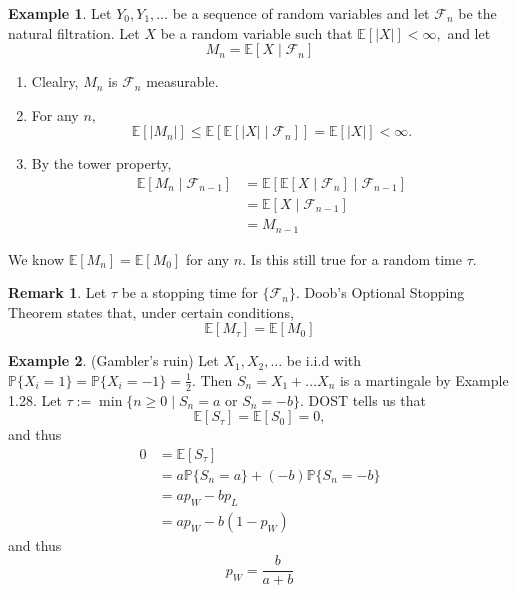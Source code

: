 \documentclass[10pt, oneside]{article}
\newcommand{\bbP}{\mathbb{P}}
\newcommand{\bbE}{\mathbb{E}}
\theoremstyle{definition}
\newtheorem{exmp}{Example}[section]
\newtheorem{rem}{Remark}
\begin{document}
\begin{exmp}
    Let $Y_0, Y_1, \dots$ be a sequence of random variables and let $\mathcal{F}_n$ be the natural filtration. Let $X$ be a random variable such that $\bbE[|X|] < \infty,$ and let 
    \[M_n = \bbE[X \mid \mathcal{F}_n]\]
    \begin{enumerate}
        \item Clealry, $M_n$ is $\mathcal{F}_n$ measurable.
        \item For any $n,$
    \[\bbE[|M_n|] \leq \bbE[\bbE[|X| \mid \mathcal{F}_n]] = \bbE[|X|] < \infty.\]
    \item By the tower property,
\begin{align*}
    \bbE[M_n \mid \mathcal{F}_{n-1}] &= \bbE[\bbE[X \mid \mathcal{F}_{n}] \mid \mathcal{F}_{n-1}]\\
    &= \bbE[X \mid \mathcal{F}_{n-1}]\\
    &= M_{n-1}
\end{align*}
    \end{enumerate}
\end{exmp}


We know $\bbE[M_n] = \bbE[M_0]$ for any $n.$ Is this still true for a random time $\tau.$ 

\begin{rem}
    Let $\tau$ be a stopping time for $\{\mathcal{F}_n\}.$ Doob's Optional Stopping Theorem states that, under certain conditions, 
    \[\bbE[M_\tau] = \bbE[M_0]\]
\end{rem}
\begin{exmp}
(Gambler's ruin)
    Let $X_1, X_2, \dots$ be i.i.d with $\bbP\{X_i = 1\} = \bbP\{X_i = -1\} = \frac{1}{2}.$ Then $S_n = X_1 + \dots X_n$ is  a martingale by Example 1.28. Let $\tau := \min\{n \geq 0 \mid S_n = a \text{ or } S_n = -b\}.$
    DOST tells us that 
    \[\bbE[S_\tau] = \bbE[S_0] = 0,\] and thus 
    \begin{align*}
        0 &= \bbE[S_\tau]\\ &= a\bbP\{S_n = a\}  + (-b)\bbP\{S_n = -b\}\\
        &= a p_W - b p_L\\
        &= ap_W - b(1-p_W)
    \end{align*}
    and thus 
    \[p_W = \frac{b}{a + b}\]
\end{exmp}

\newpage
\end{document}
